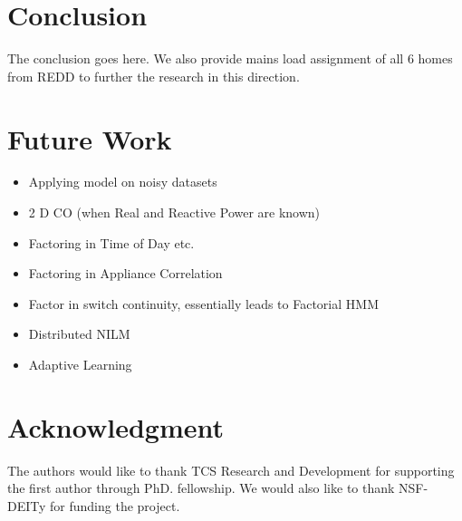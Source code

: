 \documentclass[conference]{IEEEtran}
\begin{document}
\section{Conclusion}
The conclusion goes here.
We also provide mains load assignment of all 6 homes from REDD to further the research in this direction.

\section{Future Work}
\begin{itemize}

\item Applying model on noisy datasets
\item 2 D CO (when Real and Reactive Power are known)
\item Factoring in Time of Day etc.
\item Factoring in Appliance Correlation
\item Factor in switch continuity, essentially leads to Factorial HMM
\item Distributed NILM
\item Adaptive Learning
\end{itemize}

\section*{Acknowledgment}
The authors would like to thank TCS Research and Development for supporting the first author through PhD. fellowship. We would also like to thank NSF- DEITy for funding the project.


\end{document}
